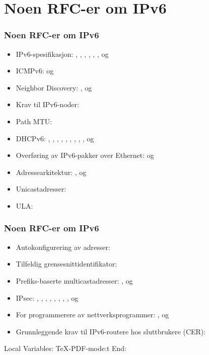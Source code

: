 \section{Noen RFC-er om IPv6}
\begin{frame}%
  \frametitle{Noen RFC-er om IPv6}
  \begin{itemize}%
  \item IPv6-spesifikasjon: , , ,
    , , ,  og 
  \item ICMPv6:  og 
  \item Neighbor Discovery: ,  og 
  \item Krav til IPv6-noder: 
  \item Path MTU: 
  \item DHCPv6: , , , ,
    , , , , ,
     og 
  \item Overføring av IPv6-pakker over Ethernet:  og
  \item Adressearkitektur: ,  og 
  \item Unicastadresser: 
  \item ULA: 
  \end{itemize}
\end{frame}

\begin{frame}%
  \frametitle{Noen RFC-er om IPv6}
  \begin{itemize}%
  \item Autokonfigurering av adresser: 
  \item Tilfeldig grensesnittidentifikator: 
  \item Prefiks-baserte multicastadresser: ,  og
  \item IPsec: , , , ,
    , , , ,  og
  \item For programmerere av nettverksprogrammer: ,
     og 
  \item Grunnleggende krav til IPv6-routere hos sluttbrukere (CER):
  \end{itemize}
\end{frame}



Local Variables:
TeX-PDF-mode:t
End:
